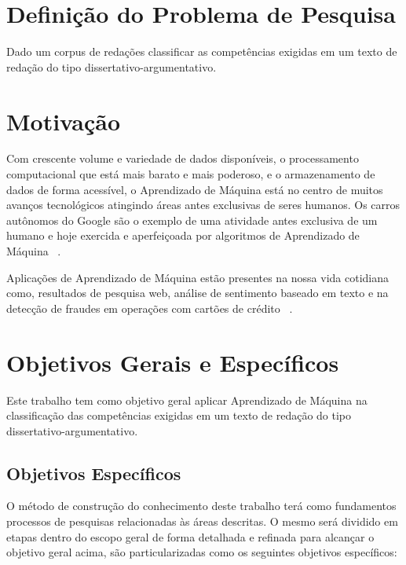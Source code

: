 \section{Definição do Problema de Pesquisa}

Dado um corpus de redações classificar as competências exigidas em um texto de redação do tipo dissertativo-argumentativo.

\section{Motivação}

Com crescente volume e variedade de dados disponíveis, o processamento computacional que está mais barato e mais poderoso, e o armazenamento de dados de forma acessível, o Aprendizado de Máquina está no centro de muitos avanços tecnológicos atingindo áreas antes exclusivas de seres humanos. Os carros autônomos do Google são o exemplo de uma atividade antes exclusiva de um humano e hoje exercida e aperfeiçoada por algoritmos de Aprendizado de Máquina ~\cite{waymo:2017}.

Aplicações de Aprendizado de Máquina estão presentes na nossa vida cotidiana como, resultados de pesquisa web, análise de sentimento baseado em texto e na detecção de fraudes em operações com cartões de crédito ~\cite{batista1999aplicando}.

\section{Objetivos Gerais e Específicos}

Este trabalho tem como objetivo geral aplicar Aprendizado de Máquina na classificação das competências exigidas em um texto de redação do tipo dissertativo-argumentativo.

\subsection{Objetivos Específicos}

O método de construção do conhecimento deste trabalho terá como fundamentos processos de pesquisas relacionadas às áreas descritas. O mesmo será dividido em etapas dentro do escopo geral de forma detalhada e refinada para alcançar o objetivo geral acima, são particularizadas como os seguintes objetivos específicos:

